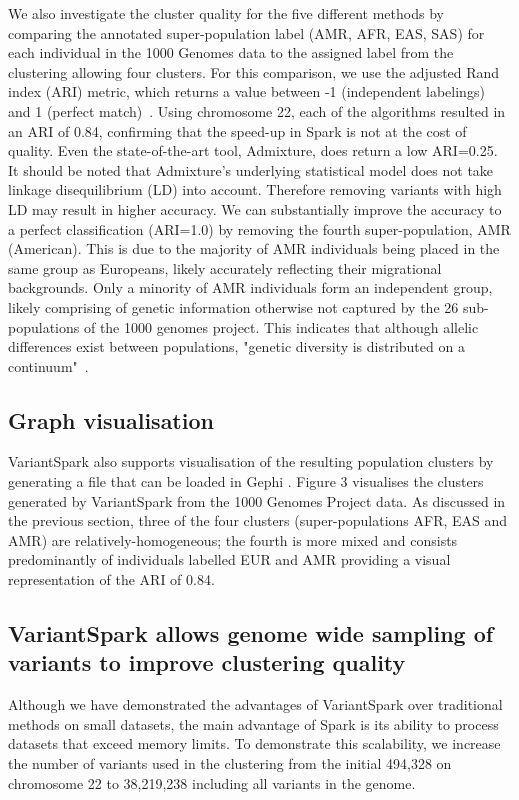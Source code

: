 \documentclass{bmcart}
\newcommand{\variantSpark}{{\sc VariantSpark}}
\newcommand{\ARI}{adjusted Rand index}
\begin{document}
We also investigate the cluster quality for the five different methods by comparing the annotated super-population label (AMR, AFR, EAS, SAS) for each individual in the 1000 Genomes data to the assigned label from the clustering allowing four clusters. 
For this comparison, we use the \ARI{} (ARI) metric, which returns a value between -1 (independent labelings) and 1 (perfect match)~\cite{Hubert1985}.
Using chromosome 22, each of the algorithms resulted in an ARI of 0.84, confirming that the speed-up in {\sc Spark} is not at the cost of quality.
Even the state-of-the-art tool, {\sc Admixture}, does return a low ARI=0.25. It should be noted that {\sc Admixture}'s underlying statistical model does not take linkage disequilibrium (LD) into account. 
Therefore removing variants with high LD may result in higher accuracy.   
We can substantially improve the accuracy to a perfect classification (ARI=1.0) by removing the fourth super-population, AMR (American). 
This is due to the majority of AMR individuals being placed in the same group as Europeans, likely accurately reflecting their migrational backgrounds. 
Only a minority of AMR individuals form an independent group, likely comprising of genetic information otherwise not captured by the 26 sub-populations of the 1000 genomes project.
This indicates that although allelic differences exist between populations, "genetic diversity is distributed on a continuum"~\cite{Pugach2015}.

\subsection*{Graph visualisation}
\variantSpark{} also supports visualisation of the resulting population clusters by generating a file that can be loaded in Gephi \cite{ICWSM09154}.
Figure 3 visualises the clusters generated by \variantSpark{} from the 1000 Genomes Project data. 
As discussed in the previous section, three of the four clusters (super-populations AFR, EAS and AMR) are relatively-homogeneous; the fourth is more mixed and 
consists predominantly of individuals labelled EUR and AMR providing a visual representation of the ARI of 0.84.


\subsection*{\variantSpark{} allows genome wide sampling of variants to improve clustering quality}
Although we have demonstrated the advantages of \variantSpark{} over traditional methods on small datasets, the main advantage of {\sc Spark} is its ability to process datasets that exceed memory limits.
To demonstrate this scalability, we increase the number of variants used in the clustering from the initial 494,328 on chromosome 22 to 38,219,238 including all variants in the genome.
\end{document}
